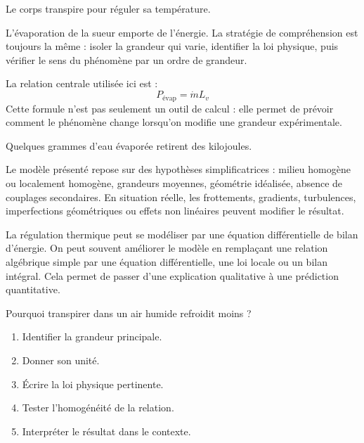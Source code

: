 \documentclass[11pt,a4paper]{article}
\begin{document}
\begin{exemplebox}
Le corps transpire pour réguler sa température.
\end{exemplebox}

\begin{methodebox}
L'évaporation de la sueur emporte de l'énergie.
La stratégie de compréhension est toujours la même : isoler la grandeur qui varie, identifier la loi physique, puis vérifier le sens du phénomène par un ordre de grandeur.
\end{methodebox}

\begin{theorembox}
La relation centrale utilisée ici est :
\[
P_{\mathrm{évap}}=\dot m L_v
\]
Cette formule n'est pas seulement un outil de calcul : elle permet de prévoir comment le phénomène change lorsqu'on modifie une grandeur expérimentale.
\end{theorembox}

\begin{odgbox}
Quelques grammes d'eau évaporée retirent des kilojoules.
\end{odgbox}

\begin{attentionbox}
Le modèle présenté repose sur des hypothèses simplificatrices : milieu homogène ou localement homogène, grandeurs moyennes, géométrie idéalisée, absence de couplages secondaires. En situation réelle, les frottements, gradients, turbulences, imperfections géométriques ou effets non linéaires peuvent modifier le résultat.
\end{attentionbox}

\begin{approfondissementbox}
La régulation thermique peut se modéliser par une équation différentielle de bilan d'énergie.
On peut souvent améliorer le modèle en remplaçant une relation algébrique simple par une équation différentielle, une loi locale ou un bilan intégral. Cela permet de passer d'une explication qualitative à une prédiction quantitative.
\end{approfondissementbox}

\begin{exercicebox}
Pourquoi transpirer dans un air humide refroidit moins ?
\begin{enumerate}
  \item Identifier la grandeur principale.
  \item Donner son unité.
  \item Écrire la loi physique pertinente.
  \item Tester l'homogénéité de la relation.
  \item Interpréter le résultat dans le contexte.
\end{enumerate}
\end{exercicebox}
\end{document}
